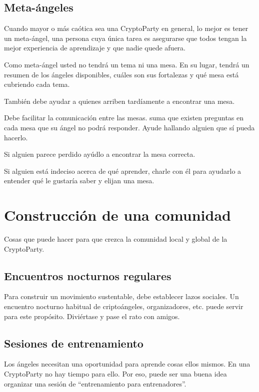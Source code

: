 \documentclass[10pt,a5paper,twoside,,]{book}
\begin{document}
\subsection{Meta-ángeles}\label{meta-uxe1ngeles}

Cuando mayor o más caótica sea una CryptoParty en general, lo mejor es
tener un meta-ángel, una persona cuya única tarea es asegurarse que
todos tengan la mejor experiencia de aprendizaje y que nadie quede
afuera.

Como meta-ángel usted no tendrá un tema ni una mesa. En su lugar, tendrá
un resumen de los ángeles disponibles, cuáles son sus fortalezas y qué
mesa está cubriendo cada tema.

También debe ayudar a quienes arriben tardíamente a encontrar una mesa.

Debe facilitar la comunicación entre las mesas. suma que existen
preguntas en cada mesa que su ángel no podrá responder. Ayude hallando
alguien que sí pueda hacerlo.

Si alguien parece perdido ayúdlo a encontrar la mesa correcta.

Si alguien está indeciso acerca de qué aprender, charle con él para
ayudarlo a entender qué le gustaría saber y elijan una mesa.

\section{Construcción de una
comunidad}\label{construcciuxf3n-de-una-comunidad}

Cosas que puede hacer para que crezca la comunidad local y global de la
CryptoParty.

\subsection{Encuentros nocturnos
regulares}\label{encuentros-nocturnos-regulares}

Para construir un movimiento sustentable, debe establecer lazos
sociales. Un encuentro nocturno habitual de criptoángeles,
organizadores, etc. puede servir para este propósito. Diviértase y pase
el rato con amigos.

\subsection{Sesiones de entrenamiento}\label{sesiones-de-entrenamiento}

Los ángeles necesitan una oportunidad para aprende cosas ellos mismos.
En una CryptoParty no hay tiempo para ello. Por eso, puede ser una buena
idea organizar una sesión de ``entrenamiento para entrenadores''.
\end{document}
